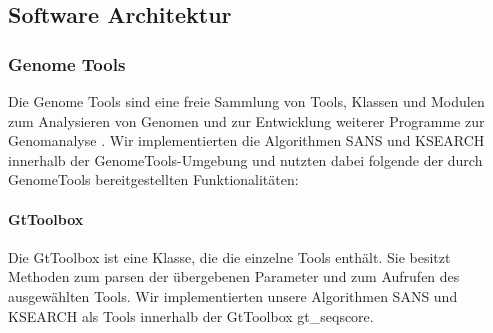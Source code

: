 \documentclass{article}
\begin{document}
%    

\subsection{Software Architektur}

\subsubsection{Genome Tools}

Die Genome Tools sind eine freie Sammlung von Tools, Klassen und Modulen zum
Analysieren von Genomen und zur Entwicklung weiterer Programme zur Genomanalyse \cite{gtools}. Wir implementierten die Algorithmen SANS und KSEARCH innerhalb der GenomeTools-Umgebung und nutzten dabei folgende der durch GenomeTools bereitgestellten Funktionalitäten:

\paragraph{GtToolbox}
Die GtToolbox ist eine Klasse, die die einzelne Tools enthält. Sie besitzt
Methoden zum parsen der übergebenen Parameter und zum Aufrufen des ausgewählten
Tools. Wir implementierten unsere Algorithmen SANS und KSEARCH als Tools
innerhalb der GtToolbox gt\_seqscore. 
\end{document}
